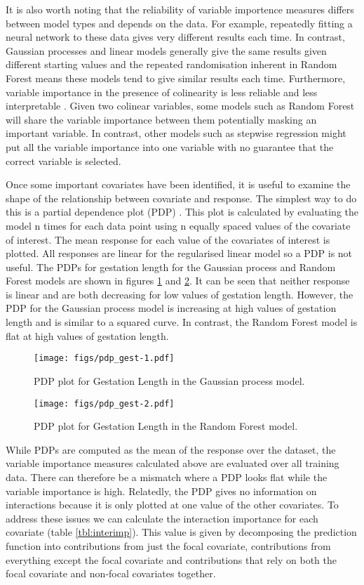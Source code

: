 \documentclass[10pt,]{article}
\begin{document}
It is also worth noting that the reliability of variable importence measures differs between model types and depends on the data. For example, repeatedly fitting a neural network to these data gives very different results each time. In contrast, Gaussian processes and linear models generally give the same results given different starting values and the repeated randomisation inherent in Random Forest means these models tend to give similar results each time. Furthermore, variable importance in the presence of colinearity is less reliable and less interpretable \citep{dormann2013collinearity}. Given two colinear variables, some models such as Random Forest will share the variable importance between them potentially masking an important variable. In contrast, other models such as stepwise regression might put all the variable importance into one variable with no guarantee that the correct variable is selected.

Once some important covariates have been identified, it is useful to examine the shape of the relationship between covariate and response. The simplest way to do this is a partial dependence plot (PDP) \citep{Friedman2001}. This plot is calculated by evaluating the model n times for each data point using n equally spaced values of the covariate of interest. The mean response for each value of the covariates of interest is plotted. All responses are linear for the regularised linear model so a PDP is not useful. The PDPs for gestation length for the Gaussian process and Random Forest models are shown in figures \ref{fig:pdpgestgp} and \ref{fig:pdpgestrf}. It can be seen that neither response is linear and are both decreasing for low values of gestation length. However, the PDP for the Gaussian process model is increasing at high values of gestation length and is similar to a squared curve. In contrast, the Random Forest model is flat at high values of gestation length.

\begin{figure}[htbp]
\centering
\texttt{[image: figs/pdp\_gest-1.pdf]}
\caption{PDP plot for Gestation Length in the Gaussian process model.\protect\label{fig:pdpgestgp}}
\end{figure}

\begin{figure}[htbp]
\centering
\texttt{[image: figs/pdp\_gest-2.pdf]}
\caption{PDP plot for Gestation Length in the Random Forest model.\protect\label{fig:pdpgestrf}}
\end{figure}

While PDPs are computed as the mean of the response over the dataset, the variable importance measures calculated above are evaluated over all training data. There can therefore be a mismatch where a PDP looks flat while the variable importance is high. Relatedly, the PDP gives no information on interactions because it is only plotted at one value of the other covariates. To address these issues we can calculate the interaction importance for each covariate (table \ref{tbl:interimp}). This value is given by decomposing the prediction function into contributions from just the focal covariate, contributions from everything except the focal covariate and contributions that rely on both the focal covariate and non-focal covariates together.
\end{document}
